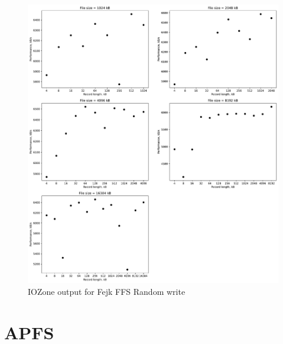 \begin{figure}[!htb]
	\label{fig:app_bench_ffsf_rnd_write}
	\begin{center}
		\includegraphics[width=1.0\textwidth]{figures/benchmarking/fake-ffs/Random write.pdf}
	\end{center}
	\caption{IOZone output for Fejk FFS Random write}
\end{figure}
\section{APFS}








